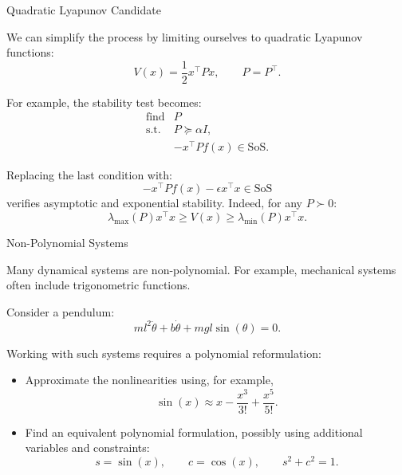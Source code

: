 \documentclass{beamer}
\begin{document}
\begin{frame}{Quadratic Lyapunov Candidate}
	\begin{flushleft}
		We can simplify the process by limiting ourselves to
		quadratic Lyapunov functions:
		\[
		V(x)=\frac{1}{2}x^\top Px,
		\qquad P=P^\top.
		\]
		
		For example, the stability test becomes:
		\[
		\begin{array}{ll}
			\text{find} & P\\[0.2em]
			\text{s.t.} &
			P\succeq\alpha I,\\
			&
			-x^\top Pf(x)\in\mathrm{SoS}.
		\end{array}
		\]
		
		
		Replacing the last condition with:
		\[
		-x^\top Pf(x)-\epsilon x^\top x\in\mathrm{SoS}
		\]
		verifies asymptotic and exponential stability. Indeed, for any $P\succ0$:
		\[
		\lambda_{\max}(P)x^\top x
		\geq V(x)
		\geq
		\lambda_{\min}(P)x^\top x.
		\]
	\end{flushleft}
\end{frame}

\begin{frame}{Non-Polynomial Systems}
	\begin{flushleft}
		Many dynamical systems are non-polynomial.
		For example, mechanical systems often include
		trigonometric functions.
		
		\bigskip
		
		Consider a pendulum:
		\[
		ml^2\ddot{\theta}
		+b\dot{\theta}
		+mgl\sin(\theta)=0.
		\]
		
		\bigskip
		
		Working with such systems requires a polynomial reformulation:
		
		\begin{itemize}
			\item Approximate the nonlinearities using, for example,
			\[
			\sin(x)\approx
			x-\frac{x^3}{3!}+\frac{x^5}{5!}.
			\]
			
			\item Find an equivalent polynomial formulation,
			possibly using additional variables and constraints:
			\[
			s=\sin(x),\qquad
			c=\cos(x),\qquad
			s^2+c^2=1.
			\]
		\end{itemize}
	\end{flushleft}
	
\end{frame}
\end{document}
